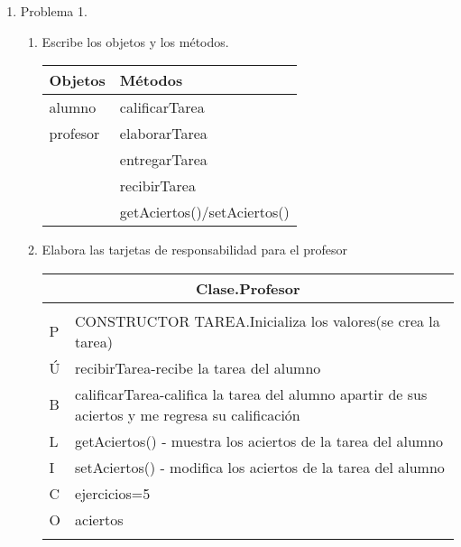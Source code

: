 \documentclass[a4paper,10pt]{article}
\begin{document}
\begin{enumerate}
    \item Problema 1.
    \begin{enumerate}
        \item Escribe los objetos y los métodos.\\
        
        \begin{tabular}{|l|l|}
            \hline
            Objetos & Métodos\\
            \hline
            alumno & calificarTarea\\
            \hline
            profesor &  elaborarTarea\\
            \hline
                     & entregarTarea\\
            \hline
                    & recibirTarea \\
            \hline
                    & getAciertos()/setAciertos() \\ 
            \hline                     
            \end{tabular}
        
        \item Elabora las tarjetas de responsabilidad para el profesor\\
                
        \begin{tabular}{ |l|l| }
            \hline
            \multicolumn{2}{|c|}{Clase.Profesor} \\
            \hline
             & \\
            P &  CONSTRUCTOR TAREA.Inicializa los valores(se crea la tarea) \\
            Ú & recibirTarea-recibe la tarea del alumno \\
            B & calificarTarea-califica la tarea del alumno apartir de sus aciertos y me regresa su calificación \\
            L  & getAciertos() - muestra los aciertos de la tarea del alumno \\
            I  & setAciertos() - modifica los aciertos de la tarea del alumno \\
            \hline
            C &  ejercicios=5 \hspace{.5cm}{Almacena los ejercicios propuestos por el profesor}\\
            O &   aciertos \hspace{1.1cm}{Almacena los aciertos obtenidos por el alumno}            \\  
             &             \\
            \hline
          \end{tabular}


\end{enumerate}
\end{enumerate}
\end{document}
